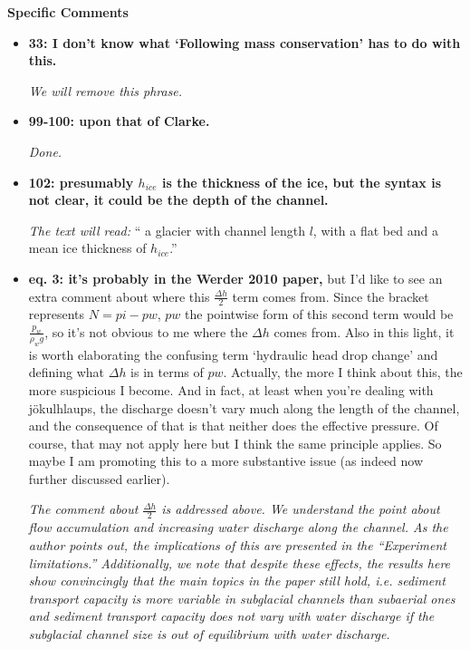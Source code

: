 \documentclass[11pt]{article}
\begin{document}
\textbf{Specific Comments}

\begin{itemize}
\item \textbf{33: I don’t know what ‘Following mass conservation’ has to do with this.}

  \textit{We will remove this phrase.}
  
\item \textbf{99-100: upon that of Clarke.}

  \textit{Done.}

\item \textbf{102: presumably $h_{ice}$ is the thickness of the ice, but the syntax is not clear, it could be the depth of the channel.}

  \textit{The text will read:} `` a glacier with channel length $l$, with a flat bed and a mean ice thickness of $h_{ice}$.''
  
\item \textbf{eq. 3: it’s probably in the Werder 2010 paper,} but I’d like to see an extra comment about where this $\frac{\Delta h}{2}$ term comes from.
  Since the bracket represents $N = pi-pw$, $pw$ the pointwise form of this second term would be $\frac{p_w}{\rho_wg}$, so it’s not obvious to me where the $\Delta h$ comes from.
  Also in this light, it is worth elaborating the confusing term ‘hydraulic head drop change’ and defining what $\Delta h$ is in terms of $pw$.
  Actually, the more I think about this, the more suspicious I become. And in fact, at least when you’re dealing with j\"okulhlaups, the discharge doesn’t vary much along the length of the channel, and the consequence of that is that neither does the effective pressure.
  Of course, that may not apply here but I think the same principle applies.
  So maybe I am promoting this to a more substantive issue
  (as indeed now further discussed earlier).

  \textit{The comment about $\frac{\Delta h}{2}$ is addressed above. We understand the point about flow accumulation and increasing water discharge along the channel. As the author points out, the implications of this are presented in the ``Experiment limitations.'' Additionally, we note that despite these effects, the results here show convincingly that the main topics in the paper still hold, i.e. sediment transport capacity is more variable in subglacial channels than subaerial ones and sediment transport capacity does not vary with water discharge if the subglacial channel size is out of equilibrium with water discharge. }



\end{itemize}
\end{document}
